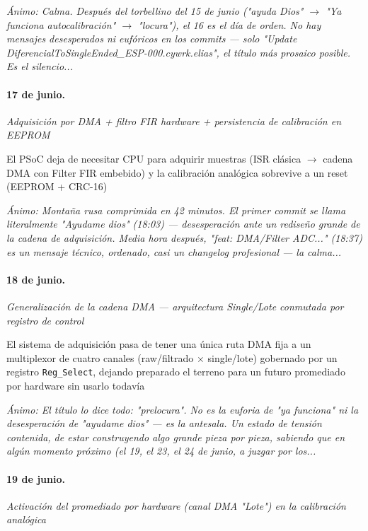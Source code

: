{\footnotesize\itshape \'Animo: Calma. Después del torbellino del 15 de junio ("ayuda Dios" $\rightarrow$ "Ya funciona autocalibración" $\rightarrow$ "locura"), el 16 es el día de orden. No hay mensajes desesperados ni eufóricos en los commits --- solo "Update DiferencialToSingleEnded\_ESP-000.cywrk.elias", el título más prosaico posible. Es el silencio...}

\paragraph{17 de junio.}
\emph{Adquisición por DMA + filtro FIR hardware + persistencia de calibración en EEPROM}

El PSoC deja de necesitar CPU para adquirir muestras (ISR clásica $\rightarrow$ cadena DMA con Filter FIR embebido) y la calibración analógica sobrevive a un reset (EEPROM + CRC-16)

{\footnotesize\itshape \'Animo: Montaña rusa comprimida en 42 minutos. El primer commit se llama literalmente "Ayudame dios" (18:03) --- desesperación ante un rediseño grande de la cadena de adquisición. Media hora después, "feat: DMA/Filter ADC..." (18:37) es un mensaje técnico, ordenado, casi un changelog profesional --- la calma...}

\paragraph{18 de junio.}
\emph{Generalización de la cadena DMA --- arquitectura Single/Lote conmutada por registro de control}

El sistema de adquisición pasa de tener una única ruta DMA fija a un multiplexor de cuatro canales (raw/filtrado $\times$ single/lote) gobernado por un registro \texttt{Reg\_Select}, dejando preparado el terreno para un futuro promediado por hardware sin usarlo todavía

{\footnotesize\itshape \'Animo: El título lo dice todo: "prelocura". No es la euforia de "ya funciona" ni la desesperación de "ayudame dios" --- es la antesala. Un estado de tensión contenida, de estar construyendo algo grande pieza por pieza, sabiendo que en algún momento próximo (el 19, el 23, el 24 de junio, a juzgar por los...}

\paragraph{19 de junio.}
\emph{Activación del promediado por hardware (canal DMA "Lote") en la calibración analógica}

